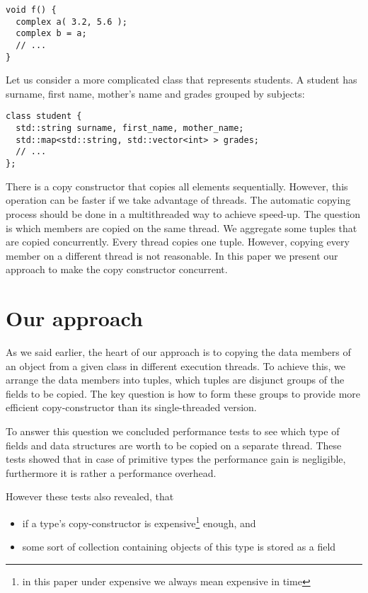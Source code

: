 \documentclass{article}
\begin{document}
\begin{verbatim}
void f() {
  complex a( 3.2, 5.6 );
  complex b = a;
  // ...
}
\end{verbatim}

Let us consider a more complicated class that represents students. A student has surname,
first name, mother's name and grades grouped by subjects:

\begin{verbatim}
class student {
  std::string surname, first_name, mother_name;
  std::map<std::string, std::vector<int> > grades;
  // ...
};
\end{verbatim}

There is a copy constructor that copies all elements sequentially. However, this operation
can be faster if we take advantage of threads. The automatic copying process should be done
in a multithreaded way to achieve speed-up. The question is which members are copied on
the same thread. We aggregate some tuples that are copied concurrently. Every thread copies
one tuple. However, copying every member on a different thread is not reasonable. In this
paper we present our approach to make the copy constructor concurrent.

\section{Our approach}
\label{approach}
As we said earlier, the heart of our approach is to copying the data members of an object from a given class in different execution threads. To achieve this, we arrange the data members into tuples, which tuples are disjunct groups of the fields to be copied. The key question is how to form these groups to provide more efficient copy-constructor than its single-threaded version. 

To answer this question we concluded performance tests to see which type of fields and data structures are worth to be copied on a separate thread. These tests showed that in case of primitive types the performance gain is negligible, furthermore it is rather a performance overhead.

However these tests also revealed, that
\begin{itemize}
 \item if a type's copy-constructor is expensive\footnote{in this paper under expensive we always mean expensive in time} enough, and
 \item some sort of collection containing objects of this type is stored as a field
\end{itemize}
\end{document}

